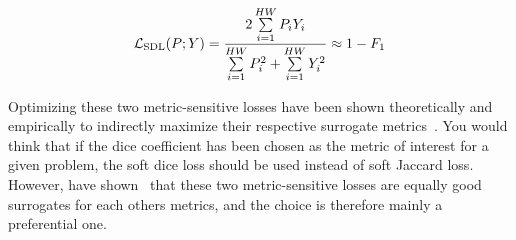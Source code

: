 \begin{equation}
  \mathcal{L}_{\mathrm{SDL}}(P; Y)
  =
  \frac{%
    2 \sum\limits_{i = 1}^{HW}
    P_i Y_i
  }{%
    \sum\limits_{i = 1}^{HW} P_i^2
    +
    \sum\limits_{i = 1}^{HW}  Y_i^2
  }
  \approx
  1 - F_1
  \label{eq:soft-dice-loss}
\end{equation}


Optimizing these two metric-sensitive losses have been shown theoretically and empirically to indirectly maximize their respective surrogate metrics~\cite{soft-losses}.
You would think that if the dice coefficient has been chosen as the metric of interest for a given problem, the soft dice loss should be used instead of soft Jaccard loss.
However, \citeauthor{soft-losses} have shown~\cite{soft-losses} that these two metric-sensitive losses are equally good surrogates for each others metrics, and the choice is therefore mainly a preferential one.
